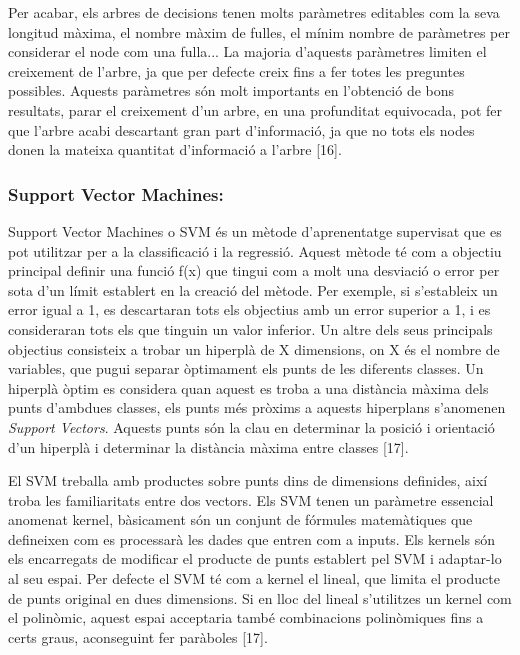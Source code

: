 \documentclass[10pt,a4paper,twocolumn,twoside]{article}
\begin{document}
Per acabar, els arbres de decisions tenen molts paràmetres editables com la seva longitud màxima, el nombre màxim de fulles, el mínim nombre de paràmetres per considerar el node com una fulla... La majoria d'aquests paràmetres limiten el creixement de l'arbre, ja que per defecte creix fins a fer totes les preguntes possibles. Aquests paràmetres són molt importants en l'obtenció de bons resultats, parar el creixement d'un arbre, en una profunditat equivocada, pot fer que l'arbre acabi descartant gran part d'informació, ja que no tots els nodes donen la mateixa quantitat d'informació a l'arbre [16].
\subsubsection{Support Vector Machines:}
Support Vector Machines o SVM és un mètode d'aprenentatge supervisat que es pot utilitzar per a la classificació i la regressió. Aquest mètode té com a objectiu principal definir una funció f(x) que tingui com a molt una desviació o error per sota d'un límit establert en la creació del mètode. Per exemple, si s'estableix un error igual a 1, es descartaran tots els objectius amb un error superior a 1, i es consideraran tots els que tinguin un valor inferior. Un altre dels seus principals objectius consisteix a trobar un hiperplà de X dimensions, on X és el nombre de variables, que pugui separar òptimament els punts de les diferents classes. Un hiperplà òptim es considera quan aquest es troba a una distància màxima dels punts d'ambdues classes, els punts més pròxims a aquests hiperplans s'anomenen \textit{Support Vectors}. Aquests punts són la clau en determinar la posició i orientació d'un hiperplà i determinar la distància màxima entre classes [17].

El SVM treballa amb productes sobre punts dins de dimensions definides, així troba les familiaritats entre dos vectors. Els SVM tenen un paràmetre essencial anomenat kernel, bàsicament són un conjunt de fórmules matemàtiques que defineixen com es processarà les dades que entren com a inputs. Els kernels són els encarregats de modificar el producte de punts establert pel SVM i adaptar-lo al seu espai. Per defecte el SVM té com a kernel el lineal, que limita el producte de punts original en dues dimensions. Si en lloc del lineal s'utilitzes un kernel com el polinòmic, aquest espai acceptaria també combinacions polinòmiques fins a certs graus, aconseguint fer paràboles [17].
\end{document}
